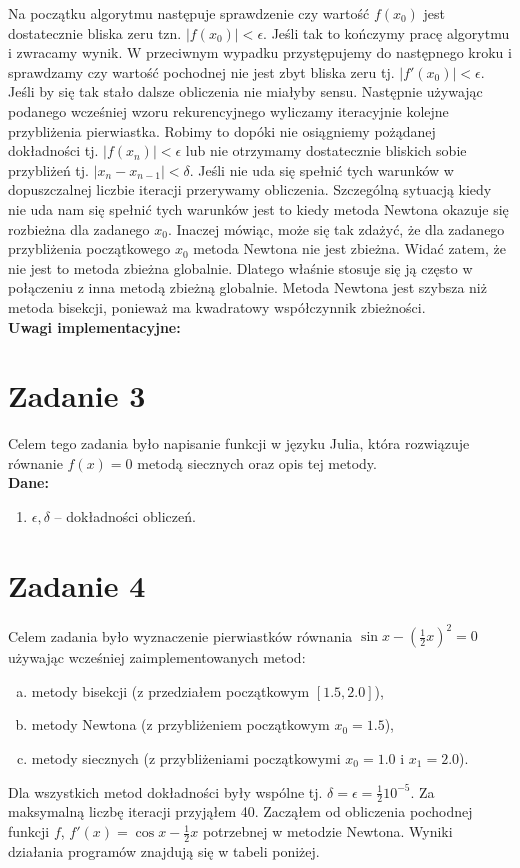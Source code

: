 \documentclass[]{article}
\begin{document}
	Na początku algorytmu następuje sprawdzenie czy wartość $f(x_0)$ jest dostatecznie bliska zeru tzn. $|f(x_0)|<\epsilon$. Jeśli tak to kończymy pracę algorytmu i zwracamy wynik. W przeciwnym wypadku przystępujemy do następnego kroku i sprawdzamy czy wartość pochodnej nie jest zbyt bliska zeru tj. $|f'(x_0)|<\epsilon$. Jeśli by się tak stało dalsze obliczenia nie miałyby sensu. Następnie używając podanego wcześniej wzoru rekurencyjnego wyliczamy iteracyjnie kolejne przybliżenia pierwiastka. Robimy to dopóki nie osiągniemy pożądanej dokładności tj. $|f(x_n)|<\epsilon$ lub nie otrzymamy dostatecznie bliskich sobie przybliżeń tj. $|x_n-x_{n-1}|<\delta$. Jeśli nie uda się spełnić tych warunków w dopuszczalnej liczbie iteracji przerywamy obliczenia. Szczególną sytuacją kiedy nie uda nam się spełnić tych warunków jest to kiedy metoda Newtona okazuje się rozbieżna dla zadanego $x_0$. Inaczej mówiąc, może się tak zdażyć, że dla zadanego przybliżenia początkowego $x_0$ metoda Newtona nie jest zbieżna. Widać zatem, że nie jest to metoda zbieżna globalnie. Dlatego właśnie stosuje się ją często w połączeniu z inna metodą zbieżną globalnie.
	Metoda Newtona jest szybsza niż metoda bisekcji, ponieważ ma kwadratowy współczynnik zbieżności.
	\\
	\textbf{Uwagi implementacyjne:}\\

	\section*{Zadanie 3} 
	
	Celem tego zadania było napisanie funkcji w języku Julia, która rozwiązuje równanie $f(x) = 0$ metodą siecznych oraz opis tej metody.\\
	\textbf{Dane:}
	\begin{enumerate}[]
		
		\item $\epsilon, \delta$ -- dokładności obliczeń.
	\end{enumerate}

	\clearpage
	
	\section*{Zadanie 4}

	Celem zadania było wyznaczenie pierwiastków równania $\sin{x}-(\frac{1}{2}x)^2 = 0$ używając wcześniej zaimplementowanych metod:
	\begin{enumerate}[(a)]
		\item metody bisekcji (z przedziałem początkowym $[1.5, 2.0]$),
		\item metody Newtona (z przybliżeniem początkowym $x_0 = 1.5$),  
		\item metody siecznych (z przybliżeniami początkowymi $x_0 = 1.0$ i $x_1 = 2.0$).
	\end{enumerate}
	Dla wszystkich metod dokładności były wspólne tj. $\delta = \epsilon = \frac{1}{2}10^{-5}$. Za maksymalną liczbę iteracji przyjąłem 40. Zacząłem od obliczenia pochodnej funkcji $f$, $f'(x) = \cos{x} - \frac{1}{2}x$ potrzebnej w metodzie Newtona. Wyniki działania programów znajdują się w tabeli poniżej.
	
\end{document}
